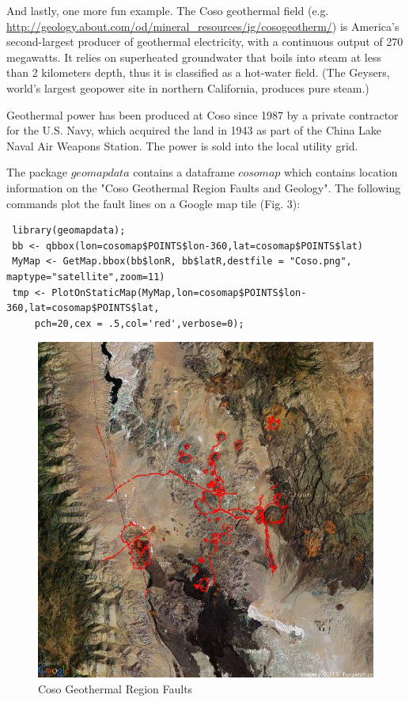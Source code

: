 \documentclass{article}
\begin{document}
\noindent And lastly, one more fun example. The Coso geothermal field (e.g. \url{http://geology.about.com/od/mineral_resources/ig/cosogeotherm/}) is America's second-largest producer of geothermal electricity, with a continuous output of 270 megawatts. It relies on superheated groundwater that boils into steam at less than 2 kilometers depth, thus it is classified as a hot-water field. (The Geysers, world's largest geopower site in northern California, produces pure steam.)

\noindent Geothermal power has been produced at Coso since 1987 by a private contractor for the U.S. Navy, which acquired the land in 1943 as part of the China Lake Naval Air Weapons Station. The power is sold into the local utility grid.

\noindent The package $geomapdata$ contains a dataframe $cosomap$ which contains location information on the "Coso Geothermal Region Faults and Geology".
The following commands plot the fault lines on a Google map tile (Fig. 3):
\begin{verbatim}
 library(geomapdata);
 bb <- qbbox(lon=cosomap$POINTS$lon-360,lat=cosomap$POINTS$lat)
 MyMap <- GetMap.bbox(bb$lonR, bb$latR,destfile = "Coso.png", maptype="satellite",zoom=11)
 tmp <- PlotOnStaticMap(MyMap,lon=cosomap$POINTS$lon-360,lat=cosomap$POINTS$lat, 
     pch=20,cex = .5,col='red',verbose=0);
\end{verbatim}

\begin{figure}[thb]
\centering
   \includegraphics[width = .975 \textwidth]{Coso.jpg}
    \caption{Coso Geothermal Region Faults}
\end{figure}
\end{document}
